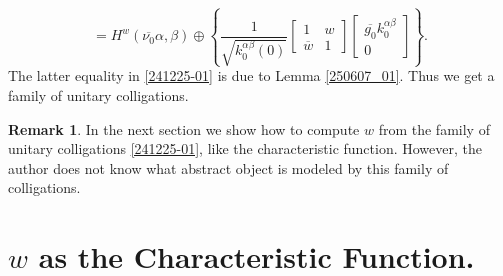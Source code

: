 \documentclass[reqno,11pt,centertags]{article}
\theoremstyle{definition}
\newtheorem{remark}[theorem]{Remark}
\def\be{\begin{equation}}
\def\ee{\end{equation}}
\def\a{\alpha}
\def\b{\beta}
\begin{document}
\be\label{241225-01}%
=
H^w(\overline{\nu_0}\a, \b)
\oplus
\left\{
\dfrac{1}{\sqrt{k^{\alpha\b}_0(0)}}
\begin{bmatrix}
1 & w \\
\overline{w} & 1
\end{bmatrix}
\begin{bmatrix}
\overline{g_0}k^{\alpha\b}_0
\\
0
\end{bmatrix}
\right\}
.
\ee
The latter equality in \eqref{241225-01} %
is due to Lemma \ref{250607_01}.
Thus we get a family of unitary colligations. 
\begin{remark}
In the next section we show how to compute $w$ from the family of unitary colligations
\eqref{241225-01}, like the characteristic function. However, the author does not know what abstract object is modeled by
this family of colligations.
\end{remark}

\section{$w$ as the Characteristic Function.}
\end{document}

